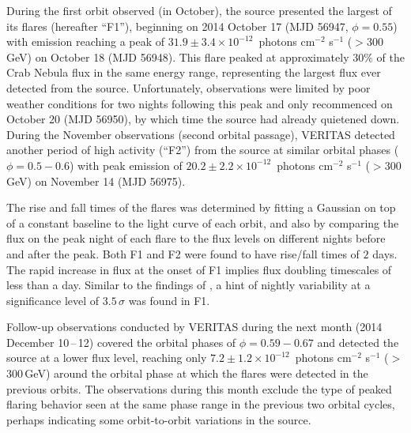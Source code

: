 \documentclass[preprint2]{aastex}
\newcommand{\tapp}{\raisebox{0.5ex}{\texttildelow}}
\newcommand{\pflux}{~photons cm$^{-2}$ s$^{-1}$}
\newcommand{\gev}{\,GeV}
\begin{document}
During the first orbit observed (in October), the source presented the largest of its flares (hereafter ``F1''), beginning on 2014 October 17 (MJD 56947, $\phi = 0.55$) with emission reaching a peak of $31.9 \pm 3.4 \times10^{-12}$\pflux{} ($>$300\gev{}) on October 18 (MJD 56948). This flare peaked at approximately $30\%$ of the Crab Nebula flux in the same energy range, representing the largest flux ever detected from the source. Unfortunately, observations were limited by poor weather conditions for two nights following this peak and only recommenced on October 20 (MJD 56950), by which time the source had already quietened down. During the November observations (second orbital passage), VERITAS detected another period of high activity (``F2'') from the source at similar orbital phases ($\phi = 0.5-0.6$) with peak emission of $20.2 \pm 2.2 \times10^{-12}$\pflux{} ($>$300\gev{}) on November 14 (MJD 56975).

The rise and fall times of the flares was determined by fitting a Gaussian on top of a constant baseline to the light curve of each orbit, and also by comparing the flux on the peak night of each flare to the flux levels on different nights before and after the peak. Both F1 and F2 were found to have rise/fall times of \tapp{}$2$ days. The rapid increase in flux at the onset of F1 implies flux doubling timescales of less than a day. Similar to the findings of \cite{2013ApJ...779...88A}, a hint of nightly variability at a significance level of \tapp{}$3.5\,\sigma$ was found in F1.

Follow-up observations conducted by VERITAS during the next month (2014 December 10\,--\,12) covered the orbital phases of $\phi=0.59-0.67$ and detected the source at a lower flux level, reaching only $7.2 \pm 1.2 \times10^{-12}$\pflux{} ($>$300\gev{}) around the orbital phase at which the flares were detected in the previous orbits. The observations during this month exclude the type of peaked flaring behavior seen at the same phase range in the previous two orbital cycles, perhaps indicating some orbit-to-orbit variations in the source.

\end{document}
